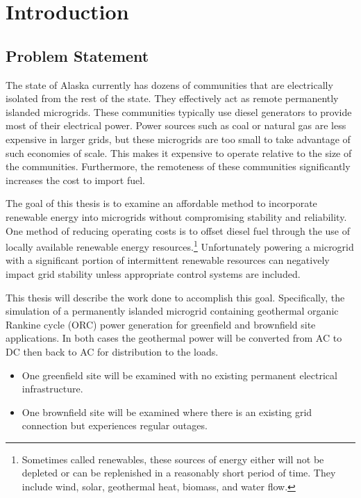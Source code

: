 \chapter{Introduction}
\label{ch:intro}

\section{Problem Statement}
The state of Alaska currently has dozens of communities that are electrically isolated from the rest of the state. They effectively act as remote permanently islanded microgrids. These communities typically use diesel generators to provide most of their electrical power. Power sources such as coal or natural gas are less expensive in larger grids, but these microgrids are too small to take advantage of such economies of scale. This makes it expensive to operate relative to the size of the communities. Furthermore, the remoteness of these communities significantly increases the cost to import fuel.

The goal of this thesis is to examine an affordable method to incorporate renewable energy into microgrids without compromising stability and reliability. One method of reducing operating costs is to offset diesel fuel through the use of locally available renewable energy resources.\footnote{Sometimes called renewables, these sources of energy either will not be depleted or can be replenished in a reasonably short period of time. They include wind, solar, geothermal heat, biomass, and water flow.} Unfortunately powering a microgrid with a significant portion of intermittent renewable resources can negatively impact grid stability unless appropriate control systems are included. 

This thesis will describe the work done to accomplish this goal. Specifically, the simulation of a permanently islanded microgrid containing geothermal organic Rankine cycle (ORC) power generation for greenfield and brownfield site applications. In both cases the geothermal power will be converted from AC to DC then back to AC for distribution to the loads.
\begin{itemize}
\item One greenfield site will be examined with no existing permanent electrical infrastructure.
\item One brownfield site will be examined where there is an existing grid connection but experiences regular outages.
\end{itemize}

